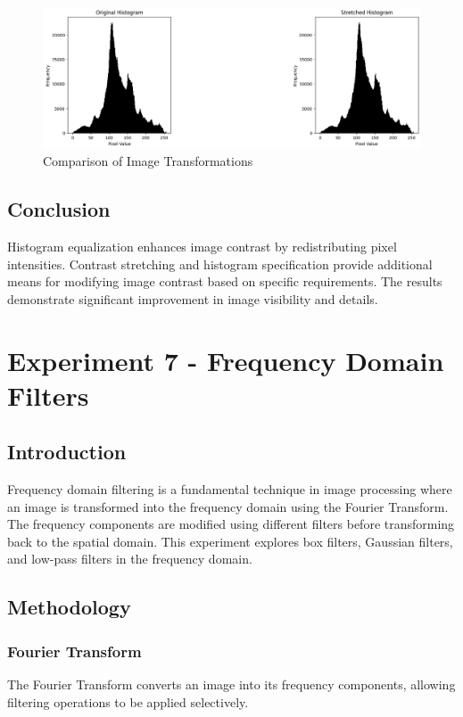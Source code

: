 \documentclass{report}
\begin{document}
\begin{figure}[h]
    \includegraphics[width=\textwidth]{images/Exp-6-Results-3.png}
    \caption{Comparison of Image Transformations}
    \label{fig:noisy}
\end{figure}

\section{Conclusion}
Histogram equalization enhances image contrast by redistributing pixel intensities. Contrast stretching and histogram specification provide additional means for modifying image contrast based on specific requirements. The results demonstrate significant improvement in image visibility and details.

\chapter{Experiment 7 - Frequency Domain Filters}

\section{Introduction}
Frequency domain filtering is a fundamental technique in image processing where an image is transformed into the frequency domain using the Fourier Transform. The frequency components are modified using different filters before transforming back to the spatial domain. This experiment explores box filters, Gaussian filters, and low-pass filters in the frequency domain.

\section{Methodology}

\subsection{Fourier Transform}
The Fourier Transform converts an image into its frequency components, allowing filtering operations to be applied selectively.
\end{document}
